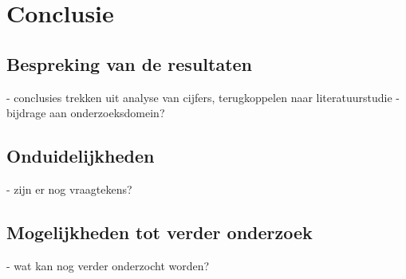 
\chapter{Conclusie}%
\label{ch:conclusie}


\section{Bespreking van de resultaten}

- conclusies trekken uit analyse van cijfers, terugkoppelen naar literatuurstudie
- bijdrage aan onderzoeksdomein?

\section{Onduidelijkheden}

- zijn er nog vraagtekens?

\section{Mogelijkheden tot verder onderzoek}

- wat kan nog verder onderzocht worden?
